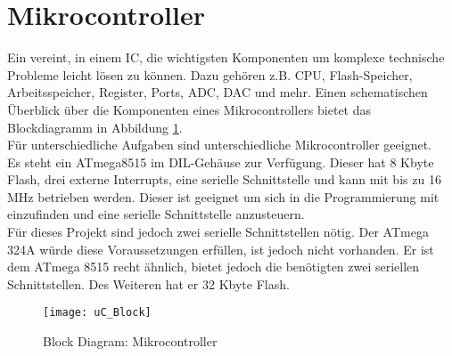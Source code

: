 \section{Mikrocontroller}
\label{sec:Mikrocontroller}
Ein  vereint, in einem IC, die wichtigsten Komponenten um komplexe technische Probleme leicht lösen zu können. Dazu gehören z.B. CPU, Flash-Speicher, Arbeitsspeicher, Register, Ports, ADC, DAC und mehr. Einen schematischen Überblick über die Komponenten eines Mikrocontrollers bietet das Blockdiagramm in Abbildung \ref{fig:uC_Blockdiagramm}. \\
Für unterschiedliche Aufgaben sind unterschiedliche Mikrocontroller geeignet.\\
Es steht ein ATmega8515\cite{atmel:8515} im DIL-Gehäuse zur Verfügung. Dieser hat 8 Kbyte Flash, drei externe Interrupts, eine serielle Schnittstelle und kann mit bis zu 16 MHz betrieben werden. 
Dieser ist geeignet um sich in die Programmierung mit  einzufinden und eine serielle Schnittstelle anzusteuern. \\
Für dieses Projekt sind jedoch zwei serielle Schnittstellen nötig. Der ATmega 324A\cite{atmel:324A} würde diese Voraussetzungen erfüllen, ist jedoch nicht vorhanden. Er ist dem ATmega 8515 recht ähnlich, bietet jedoch die benötigten zwei seriellen Schnittstellen. Des Weiteren hat er 32 Kbyte Flash. 
\begin{figure}[htb]
\centering
\texttt{[image: uC\_Block]}
\caption{Block Diagram: Mikrocontroller}
\label{fig:uC_Blockdiagramm}
\citep{atmel:ug_324A}
\end{figure}

